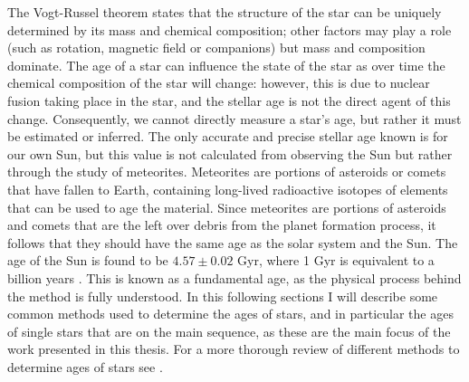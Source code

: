 The Vogt-Russel theorem states that the structure of the star can be uniquely determined by its mass and chemical composition; other factors may play a role (such as rotation, magnetic field or companions) but mass and composition dominate. The age of a star can influence the state of the star as over time the chemical composition of the star will change: however, this is due to nuclear fusion taking place in the star, and the stellar age is not the direct agent of this change. Consequently, we cannot directly measure a star's age, but rather it must be estimated or inferred. The only accurate and precise stellar age known is for our own Sun, but this value is not calculated from observing the Sun but rather through the study of meteorites. Meteorites are portions of asteroids or comets that have fallen to Earth, containing long-lived radioactive isotopes of elements that can be used to age the material. Since meteorites are portions of asteroids and comets that are the left over debris from the planet formation process, it follows that they should have the same age as the solar system and the Sun. The age of the Sun is found to be $4.57 \pm 0.02$ Gyr, where 1 Gyr is equivalent to a billion years \citep{Bahcall_etal_1995}. This is known as a fundamental age, as the physical process behind the method is fully understood. In this following sections I will describe some common methods used to determine the ages of stars, and in particular the ages of single stars that are on the main sequence, as these are the main focus of the work presented in this thesis. For a more thorough review of different methods to determine ages of stars see \citet{Soderblom_2010}.

